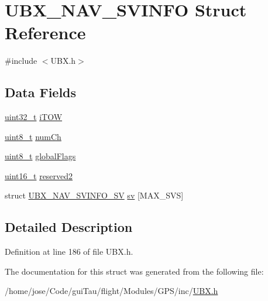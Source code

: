 \hypertarget{struct_u_b_x___n_a_v___s_v_i_n_f_o}{\section{U\-B\-X\-\_\-\-N\-A\-V\-\_\-\-S\-V\-I\-N\-F\-O Struct Reference}
\label{struct_u_b_x___n_a_v___s_v_i_n_f_o}
}


{\ttfamily \#include $<$U\-B\-X.\-h$>$}

\subsection*{Data Fields}
\begin{DoxyCompactItemize}
\item 
\hyperlink{stdint_8h_a435d1572bf3f880d55459d9805097f62}{uint32\-\_\-t} \hyperlink{group___g_s_p_module_gaf3c4fbdc3e4b6fe40fae556f1de555bb}{i\-T\-O\-W}
\item 
\hyperlink{stdint_8h_aba7bc1797add20fe3efdf37ced1182c5}{uint8\-\_\-t} \hyperlink{group___g_s_p_module_ga0c11d355a8dcd6cf6687ce19ae052a52}{num\-Ch}
\item 
\hyperlink{stdint_8h_aba7bc1797add20fe3efdf37ced1182c5}{uint8\-\_\-t} \hyperlink{group___g_s_p_module_ga9ea30e93a506e7749f8121ff4e811aae}{global\-Flags}
\item 
\hyperlink{stdint_8h_a273cf69d639a59973b6019625df33e30}{uint16\-\_\-t} \hyperlink{group___g_s_p_module_ga2c5c4d3b1882220da507ddacbe43159b}{reserved2}
\item 
struct \hyperlink{struct_u_b_x___n_a_v___s_v_i_n_f_o___s_v}{U\-B\-X\-\_\-\-N\-A\-V\-\_\-\-S\-V\-I\-N\-F\-O\-\_\-\-S\-V} \hyperlink{group___g_s_p_module_gae22f11e4be4f99b2627ff494e335a313}{sv} \mbox{[}M\-A\-X\-\_\-\-S\-V\-S\mbox{]}
\end{DoxyCompactItemize}


\subsection{Detailed Description}


Definition at line 186 of file U\-B\-X.\-h.



The documentation for this struct was generated from the following file\-:\begin{DoxyCompactItemize}
\item 
/home/jose/\-Code/gui\-Tau/flight/\-Modules/\-G\-P\-S/inc/\hyperlink{_u_b_x_8h}{U\-B\-X.\-h}\end{DoxyCompactItemize}
